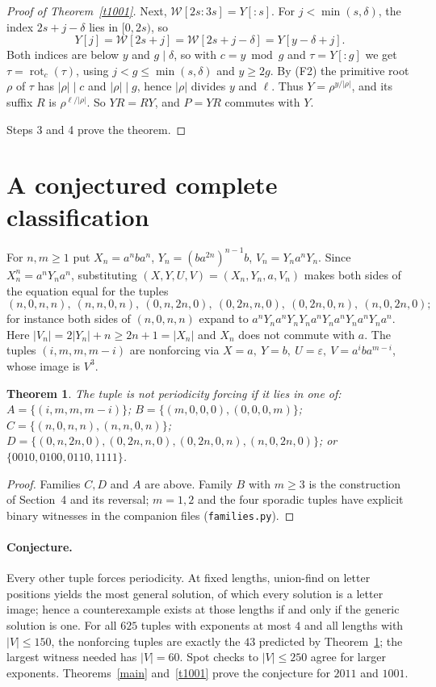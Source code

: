 \documentclass[10pt]{article}
\newtheorem{theorem}{Theorem}
\newcommand{\eps}{\varepsilon}
\theoremstyle{remark}\newtheorem*{remark}{Remark}
\begin{document}
\begin{proof}[Proof of Theorem~\ref{t1001}]
Next, \(\mathcal W[2s{:}3s]=Y[{:}s]\). For \(j<\min(s,\delta)\), the index \(2s+j-\delta\) lies in \([0,2s)\), so
\[
 Y[j]=\mathcal W[2s+j]=\mathcal W[2s+j-\delta]=Y[y-\delta+j].
\]
Both indices are below \(y\) and \(g\mid\delta\), so with \(c=y\bmod g\) and \(\tau=Y[{:}g]\) we get \(\tau=\operatorname{rot}_c(\tau)\), using \(j<g\le\min(s,\delta)\) and \(y\ge2g\). By (F2) the primitive root \(\rho\) of \(\tau\) has \(|\rho|\mid c\) and \(|\rho|\mid g\), hence \(|\rho|\) divides \(y\) and \(\ell\). Thus \(Y=\rho^{y/|\rho|}\), and its suffix \(R\) is \(\rho^{\ell/|\rho|}\). So \(YR=RY\), and \(P=YR\) commutes with \(Y\).

Steps 3 and 4 prove the theorem.
\end{proof}

\section{A conjectured complete classification}
For \(n,m\ge1\) put \(X_n=a^nba^n\), \(Y_n=(ba^{2n})^{n-1}b\), \(V_n=Y_na^nY_n\). Since \(X_n^n=a^nY_na^n\), substituting \((X,Y,U,V)=(X_n,Y_n,a,V_n)\) makes both sides of the equation equal for the tuples
\[
(n,0,n,n),\ (n,n,0,n),\ (0,n,2n,0),\ (0,2n,n,0),\ (0,2n,0,n),\ (n,0,2n,0);
\]
for instance both sides of \((n,0,n,n)\) expand to \(a^nY_na^nY_nY_na^nY_na^nY_na^nY_na^n\). Here \(|V_n|=2|Y_n|+n\ge 2n+1=|X_n|\) and \(X_n\) does not commute with \(a\). The tuples \((i,m,m,m-i)\) are nonforcing via \(X=a,\ Y=b,\ U=\eps,\ V=a^iba^{m-i}\), whose image is \(V^3\).

\begin{theorem}\label{nonforcing}
The tuple is not periodicity forcing if it lies in one of: \(A=\{(i,m,m,m-i)\}\); \(B=\{(m,0,0,0),(0,0,0,m)\}\); \(C=\{(n,0,n,n),(n,n,0,n)\}\); \(D=\{(0,n,2n,0),(0,2n,n,0),(0,2n,0,n),(n,0,2n,0)\}\); or \(\{0010,0100,0110,1111\}\).
\end{theorem}
\begin{proof}
Families \(C,D\) and \(A\) are above. Family \(B\) with \(m\ge3\) is the construction of Section~4 and its reversal; \(m=1,2\) and the four sporadic tuples have explicit binary witnesses in the companion files (\texttt{families.py}).
\end{proof}

\paragraph{Conjecture.} Every other tuple forces periodicity. At fixed lengths, union-find on letter positions yields the most general solution, of which every solution is a letter image; hence a counterexample exists at those lengths if and only if the generic solution is one. For all \(625\) tuples with exponents at most \(4\) and all lengths with \(|V|\le150\), the nonforcing tuples are exactly the \(43\) predicted by Theorem~\ref{nonforcing}; the largest witness needed has \(|V|=60\). Spot checks to \(|V|\le250\) agree for larger exponents. Theorems~\ref{main} and~\ref{t1001} prove the conjecture for \(2011\) and \(1001\).
\end{document}
